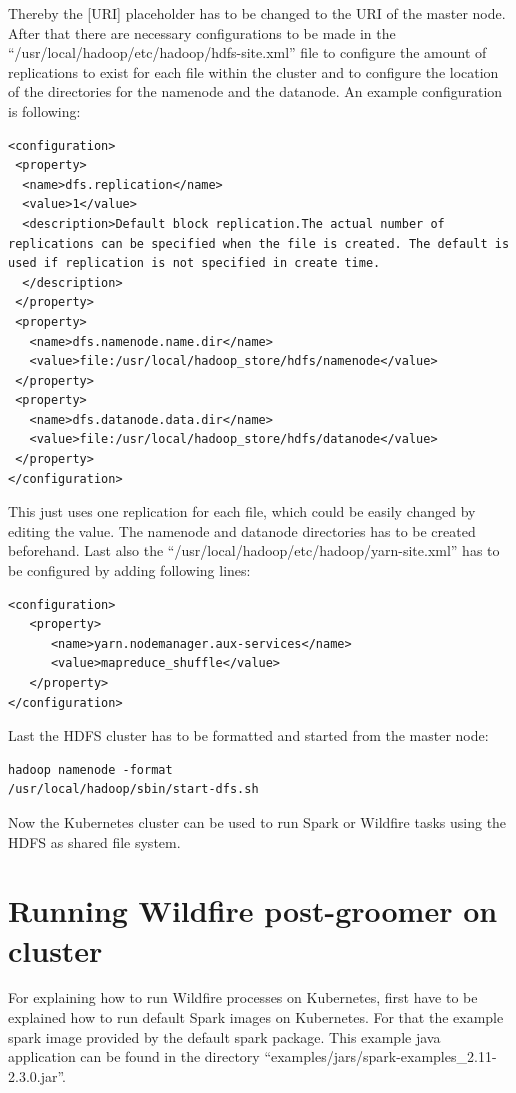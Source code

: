 Thereby the [URI] placeholder has to be changed to the URI of the master node. After that there are necessary configurations to be made in the ``/usr/local/hadoop/etc/hadoop/hdfs-site.xml'' file to configure the amount of replications to exist for each file within the cluster and to configure the location of the directories for the namenode and the datanode. An example configuration is following:
\begin{lstlisting}[caption={Configurations hdfs-site.xml},captionpos=b]
<configuration>
 <property>
  <name>dfs.replication</name>
  <value>1</value>
  <description>Default block replication.The actual number of replications can be specified when the file is created. The default is used if replication is not specified in create time.
  </description>
 </property>
 <property>
   <name>dfs.namenode.name.dir</name>
   <value>file:/usr/local/hadoop_store/hdfs/namenode</value>
 </property>
 <property>
   <name>dfs.datanode.data.dir</name>
   <value>file:/usr/local/hadoop_store/hdfs/datanode</value>
 </property>
</configuration>
\end{lstlisting}
This just uses one replication for each file, which could be easily changed by editing the value. The namenode and datanode directories has to be created beforehand. Last also the ``/usr/local/hadoop/etc/hadoop/yarn-site.xml'' has to be configured by adding following lines:
\begin{lstlisting}[caption={Configurations yarn-site.xml},captionpos=b]
<configuration>
   <property>
      <name>yarn.nodemanager.aux-services</name>
      <value>mapreduce_shuffle</value>
   </property>
</configuration>
\end{lstlisting}

Last the HDFS cluster has to be formatted and started from the master node:
\begin{lstlisting}[caption={Start hadoop cluster},captionpos=b]
hadoop namenode -format
/usr/local/hadoop/sbin/start-dfs.sh
\end{lstlisting}

Now the Kubernetes cluster can be used to run Spark or Wildfire tasks using the HDFS as shared file system.

\section{Running Wildfire post-groomer on cluster}

For explaining how to run Wildfire processes on Kubernetes, first have to be explained how to run default Spark images on Kubernetes. For that the example spark image provided by the default spark package. This example java application can be found in the directory ``examples/jars/spark-examples\_2.11-2.3.0.jar''.

